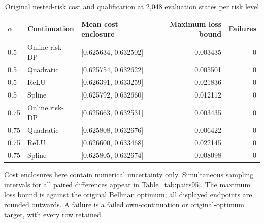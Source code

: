 \begin{table}[htbp]
\caption{Original nested-risk cost and qualification at 2,048 evaluation states per risk level}\label{tab:cost95}
\centering\small
\begin{tabular}{@{}lllrr@{}}
\toprule
$\alpha$ & Continuation & Mean cost enclosure & Maximum loss bound & Failures\\\midrule
0.5 & Online risk-DP & [0.625634, 0.632502] & 0.003435 & 0\\
0.5 & Quadratic & [0.625754, 0.632622] & 0.005501 & 0\\
0.5 & ReLU & [0.626391, 0.633259] & 0.021836 & 0\\
0.5 & Spline & [0.625792, 0.632660] & 0.012112 & 0\\
0.75 & Online risk-DP & [0.625663, 0.632531] & 0.003435 & 0\\
0.75 & Quadratic & [0.625808, 0.632676] & 0.006422 & 0\\
0.75 & ReLU & [0.626600, 0.633468] & 0.022145 & 0\\
0.75 & Spline & [0.625805, 0.632674] & 0.008098 & 0\\
\bottomrule
\end{tabular}
\par\smallskip\begin{minipage}{.98\linewidth}\footnotesize Cost enclosures here contain numerical uncertainty only. Simultaneous sampling intervals for all paired differences appear in Table~\ref{tab:pairs95}. The maximum loss bound is against the original Bellman optimum; all displayed endpoints are rounded outwards. A failure is a failed own-continuation or original-optimum target, with every row retained.\end{minipage}
\end{table}
